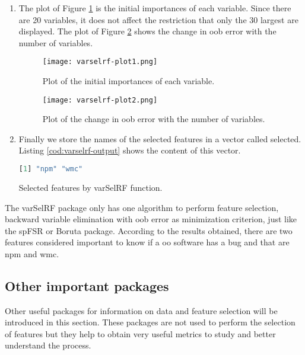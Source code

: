 \begin{enumerate}
    \item The plot of Figure \ref{fig:varselrf-plot1} is the initial importances of each variable. Since there are 20 variables, it does not affect the restriction that only the 30 largest are displayed. The plot of Figure \ref{fig:varselrf-plot2} shows the change in \acrshort{oob} error with the number of variables.
    
    \begin{figure}[H]
        \centering
        \texttt{[image: varselrf-plot1.png]}
        \caption{Plot of the initial importances of each variable.}
        \label{fig:varselrf-plot1}
    \end{figure}
    
    \begin{figure}[H]
        \centering
        \texttt{[image: varselrf-plot2.png]}
        \caption{Plot of the change in \acrshort{oob} error with the number of variables.}
        \label{fig:varselrf-plot2}
    \end{figure}
    
    \item Finally we store the names of the selected features in a vector called selected. Listing \ref{cod:varselrf-output} shows the content of this vector.

\begin{codefloat}[H]
\begin{lstlisting}[language=R, style=console]
[1] "npm" "wmc"
\end{lstlisting}
\caption{Selected features by varSelRF function.}
\label{cod:varselrf-output}
\end{codefloat}

\end{enumerate}

The varSelRF package only has one algorithm to perform feature selection, backward variable elimination with \acrshort{oob} error as minimization criterion, just like the spFSR or Boruta package. According to the results obtained, there are two features considered important to know if a \acrshort{oo} software has a bug and that are \acrfull{npm} and \acrfull{wmc}.

\subsection{Other important packages}
\label{sec:other-packages}

Other useful packages for information on data and feature selection will be introduced in this section. These packages are not used to perform the selection of features but they help to obtain very useful metrics to study and better understand the process.

